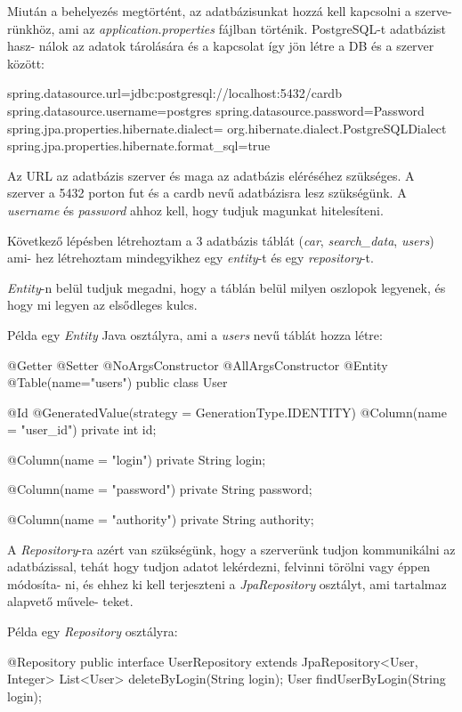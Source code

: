 Miután a behelyezés megtörtént, az adatbázisunkat hozzá kell kapcsolni a szerve-
rünkhöz, ami az \textit{application.properties} fájlban történik. PostgreSQL-t adatbázist hasz-
nálok az adatok tárolására és a kapcsolat így jön létre a DB és a szerver között:

\begin{java}
spring.datasource.url=jdbc:postgresql://localhost:5432/cardb
spring.datasource.username=postgres
spring.datasource.password=Password
spring.jpa.properties.hibernate.dialect=
  org.hibernate.dialect.PostgreSQLDialect
spring.jpa.properties.hibernate.format_sql=true
\end{java}

Az URL az adatbázis szerver és maga az adatbázis eléréséhez szükséges. A szerver a 5432 porton fut és a cardb nevű adatbázisra lesz szükségünk.
A \textit{username} és \textit{password} ahhoz kell, hogy tudjuk magunkat hitelesíteni.

Következő lépésben létrehoztam a 3 adatbázis táblát (\textit{car}, \textit{search\_data}, \textit{users}) ami-
hez létrehoztam mindegyikhez egy \textit{entity}-t és egy \textit{repository}-t.

\textit{Entity}-n belül tudjuk megadni, hogy a táblán belül milyen oszlopok legyenek, és hogy mi legyen az elsődleges kulcs.

Példa egy \textit{Entity} Java osztályra, ami a \textit{users} nevű táblát hozza létre:

\begin{java}
@Getter
@Setter
@NoArgsConstructor
@AllArgsConstructor
@Entity
@Table(name="users")
public class User {
    @Id
    @GeneratedValue(strategy = GenerationType.IDENTITY)
    @Column(name = "user_id")
    private int id;

    @Column(name = "login")
    private String login;

    @Column(name = "password")
    private String password;

    @Column(name = "authority")
    private String authority;
}
\end{java}

A \textit{Repository}-ra azért van szükségünk, hogy a szerverünk tudjon kommunikálni az adatbázissal, tehát hogy tudjon adatot lekérdezni, felvinni törölni vagy éppen módosíta-
ni, és ehhez ki kell terjeszteni a \textit{JpaRepository} osztályt, ami tartalmaz alapvető művele-
teket.

Példa egy \textit{Repository} osztályra:

\begin{java}
@Repository
public interface UserRepository
extends JpaRepository<User, Integer> {
    List<User> deleteByLogin(String login);
    User findUserByLogin(String login);
}
\end{java}
\newpage

